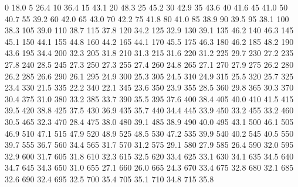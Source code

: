 0 18.0
5 26.4
10 36.4
15 43.1
20 48.3
25 45.2
30 42.9
35 43.6
40 41.6
45 41.0
50 40.7
55 39.2
60 42.0
65 43.0
70 42.2
75 41.8
80 41.0
85 38.9
90 39.5
95 38.1
100 38.3
105 39.0
110 38.7
115 37.8
120 34.2
125 32.9
130 39.1
135 46.2
140 46.3
145 45.1
150 44.1
155 44.8
160 44.2
165 44.1
170 45.5
175 46.3
180 46.2
185 48.2
190 43.6
195 34.4
200 32.3
205 31.8
210 31.3
215 31.6
220 31.2
225 29.7
230 27.2
235 27.8
240 28.5
245 27.3
250 27.3
255 27.4
260 24.8
265 27.1
270 27.9
275 26.2
280 26.2
285 26.6
290 26.1
295 24.9
300 25.3
305 24.5
310 24.9
315 25.5
320 25.7
325 23.4
330 21.5
335 22.2
340 22.1
345 23.6
350 23.9
355 28.5
360 29.8
365 30.3
370 30.4
375 31.0
380 33.2
385 33.7
390 35.5
395 37.6
400 38.4
405 40.0
410 41.5
415 39.5
420 38.8
425 37.5
430 36.9
435 35.7
440 34.4
445 33.9
450 33.2
455 33.2
460 30.5
465 32.3
470 28.4
475 38.0
480 39.1
485 38.9
490 40.0
495 43.1
500 46.1
505 46.9
510 47.1
515 47.9
520 48.9
525 48.5
530 47.2
535 39.9
540 40.2
545 40.5
550 39.7
555 36.7
560 34.4
565 31.7
570 31.2
575 29.1
580 27.9
585 26.4
590 32.0
595 32.9
600 31.7
605 31.8
610 32.3
615 32.5
620 33.4
625 33.1
630 34.1
635 34.5
640 34.7
645 34.3
650 31.0
655 27.1
660 26.0
665 24.3
670 33.4
675 32.8
680 32.1
685 32.6
690 32.4
695 32.5
700 35.4
705 35.1
710 34.8
715 35.8
